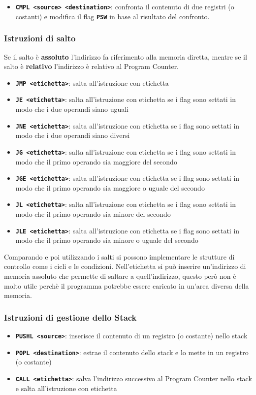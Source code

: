 \documentclass[a4paper]{article}
\theoremstyle{break}
\theoremstyle{break}
\theoremstyle{break}
\theoremstyle{break}
\begin{document}
\begin{itemize}
	\item \textbf{\texttt{CMPL <source> <destination>}}: confronta il contenuto di due registri (o costanti) e
	      modifica il flag \textbf{\texttt{PSW}} in base al risultato del confronto.
\end{itemize}

\subsubsection{Istruzioni di salto}
Se il salto è \textbf{assoluto} l'indirizzo fa riferimento alla memoria diretta, mentre se il salto è
\textbf{relativo} l'indirizzo è relativo al Program Counter.
\begin{itemize}
	\item \textbf{\texttt{JMP <etichetta>}}: salta all'istruzione con etichetta
	\item \textbf{\texttt{JE <etichetta>}}: salta all'istruzione con etichetta se i flag sono settati in modo che i due operandi siano uguali
	\item \textbf{\texttt{JNE <etichetta>}}: salta all'istruzione con etichetta se i flag sono settati in modo che i due operandi siano diversi
	\item \textbf{\texttt{JG <etichetta>}}: salta all'istruzione con etichetta se i flag sono settati in modo che il primo operando sia maggiore del secondo
	\item \textbf{\texttt{JGE <etichetta>}}: salta all'istruzione con etichetta se i flag sono settati in modo che il primo operando sia maggiore o uguale del secondo
	\item \textbf{\texttt{JL <etichetta>}}: salta all'istruzione con etichetta se i flag sono settati in modo che il primo operando sia minore del secondo
	\item \textbf{\texttt{JLE <etichetta>}}: salta all'istruzione con etichetta se i flag sono settati in modo che il primo operando sia minore o uguale del secondo
\end{itemize}
Comparando e poi utilizzando i salti si possono implementare le strutture di controllo come i cicli e le condizioni.
Nell'etichetta si può inserire un'indirizzo di memoria assoluto che permette di saltare a quell'indirizzo,
questo però non è molto utile perchè il programma potrebbe essere caricato in un'area diversa della memoria.

\subsubsection{Istruzioni di gestione dello Stack}
\begin{itemize}
	\item \textbf{\texttt{PUSHL <source>}}: inserisce il contenuto di un registro (o costante) nello stack
	\item \textbf{\texttt{POPL <destination>}}: estrae il contenuto dello stack e lo mette in un registro (o costante)
	\item \textbf{\texttt{CALL <etichetta>}}: salva l'indirizzo successivo al Program Counter nello stack e salta all'istruzione con etichetta
\end{itemize}
\end{document}
